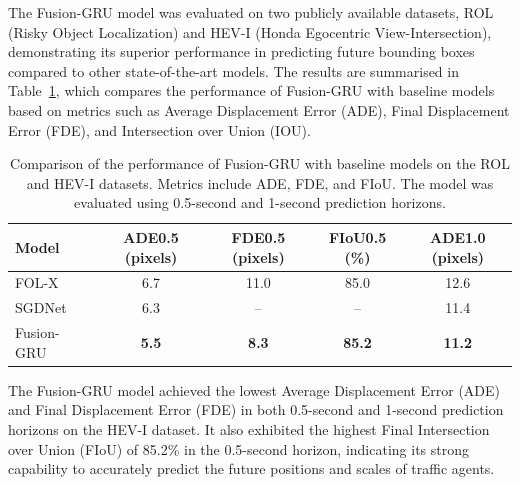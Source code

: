 \documentclass[12pt,oneside]{book} %
\begin{document}
The Fusion-GRU model was evaluated on two publicly available datasets, ROL
(Risky Object Localization) and HEV-I (Honda Egocentric View-Intersection),
demonstrating its superior performance in predicting future bounding boxes
compared to other state-of-the-art models. The results are summarised in
Table~\ref{tab:fusion-gru-results}, which compares the performance of
Fusion-GRU with baseline models based on metrics such as Average Displacement
Error (ADE), Final Displacement Error (FDE), and Intersection over Union (IOU).

\begin{table}[H]
    \centering
    \caption{Comparison of the performance of Fusion-GRU with baseline models on the ROL and HEV-I datasets. Metrics include ADE, FDE, and FIoU. The model was evaluated using 0.5-second and 1-second prediction horizons.}
    \begin{adjustbox}{max width=\textwidth}
        \begin{tabular}{lcccc}
            \toprule
            \textbf{Model}              & \textbf{ADE0.5 (pixels)} & \textbf{FDE0.5 (pixels)} & \textbf{FIoU0.5 (\%)} & \textbf{ADE1.0 (pixels)} \\ 
            \midrule
            FOL-X~\cite{FusionGRU}      & 6.7                      & 11.0                     & 85.0                  & 12.6                     \\
            SGDNet~\cite{FusionGRU}     & 6.3                      & --                       & --                    & 11.4                     \\
            Fusion-GRU~\cite{FusionGRU} & \textbf{5.5}             & \textbf{8.3}             & \textbf{85.2}         & \textbf{11.2}            \\
            \bottomrule
        \end{tabular}
    \end{adjustbox}
    \label{tab:fusion-gru-results}
\end{table}

The Fusion-GRU model achieved the lowest Average Displacement Error (ADE) and
Final Displacement Error (FDE) in both 0.5-second and 1-second prediction
horizons on the HEV-I dataset. It also exhibited the highest Final Intersection
over Union (FIoU) of 85.2\% in the 0.5-second horizon, indicating its strong
capability to accurately predict the future positions and scales of traffic
agents.

\end{document}
